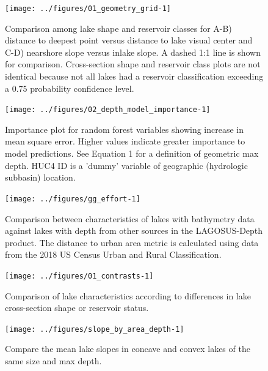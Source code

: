 \documentclass[draft,wrr]{agutexSI2019}
\begin{document}
\begin{figure}
      \noindent\texttt{[image: ../figures/01\_geometry\_grid-1]}
      \caption{Comparison among lake shape and reservoir classes for A-B) distance to deepest point versus distance to lake visual center and C-D) nearshore slope versus inlake slope. A dashed 1:1 line is shown for comparison. Cross-section shape and reservoir class plots are not identical because not all lakes had a reservoir classification exceeding a 0.75 probability confidence level.}\label{figS4}
      \end{figure}

\begin{figure}
      \noindent\texttt{[image: ../figures/02\_depth\_model\_importance-1]}
      \caption{Importance plot for random forest variables showing increase in mean square error. Higher values indicate greater importance to model predictions. See Equation 1 for a definition of geometric max depth. HUC4 ID is a 'dummy' variable of geographic (hydrologic subbasin) location.}\label{figS5}
      \end{figure}

\begin{figure}
      \begin{center}\texttt{[image: ../figures/gg\_effort-1]}\end{center}
            \caption{Comparison between characteristics of lakes with bathymetry data against lakes with depth from other sources in the LAGOSUS-Depth product. The distance to urban area metric is calculated using data from the 2018 US Census Urban and Rural Classification.}\label{figS6}
      \end{figure}

\clearpage
\begin{figure}
      \begin{center}\texttt{[image: ../figures/01\_contrasts-1]}\end{center}
      \caption{Comparison of lake characteristics according to differences in lake cross-section shape or reservoir status.}\label{figS7}
      \end{figure}

\clearpage

\begin{figure}
      \begin{center}
        \texttt{[image: ../figures/slope\_by\_area\_depth-1]}
      \end{center}
      \caption{Compare the mean lake slopes in concave and convex lakes of the same size and max depth.}\label{figS1}
    \end{figure}
\clearpage
\end{document}
